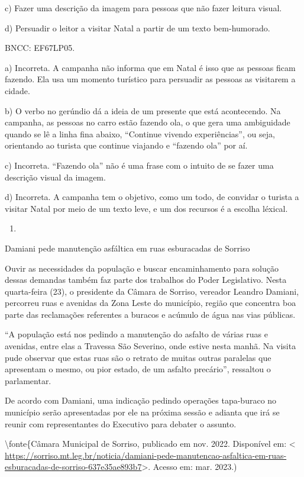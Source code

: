 c) Fazer uma descrição da imagem para pessoas que não fazer leitura
visual.

d) Persuadir o leitor a visitar Natal a partir de um texto bem-humorado.

BNCC: EF67LP05.

a) Incorreta. A campanha não informa que em Natal é isso que as pessoas
ficam fazendo. Ela usa um momento turístico para persuadir as pessoas as
visitarem a cidade.

b) O verbo no gerúndio dá a ideia de um presente que está acontecendo.
Na campanha, as pessoas no carro estão fazendo ola, o que gera uma
ambiguidade quando se lê a linha fina abaixo, ``Continue vivendo
experiências'', ou seja, orientando ao turista que continue viajando e
``fazendo ola'' por aí.

c) Incorreta. ``Fazendo ola'' não é uma frase com o intuito de se fazer
uma descrição visual da imagem.

d) Incorreta. A campanha tem o objetivo, como um todo, de convidar o
turista a visitar Natal por meio de um texto leve, e um dos recursos é a
escolha léxical.

\begin{enumerate}
\def\labelenumi{\arabic{enumi}.}
\setcounter{enumi}{13}
\tightlist
\item
\end{enumerate}

Damiani pede manutenção asfáltica em ruas esburacadas de Sorriso

Ouvir as necessidades da população e buscar encaminhamento para solução
dessas demandas também faz parte dos trabalhos do Poder Legislativo.
Nesta quarta-feira (23), o presidente da Câmara de Sorriso, vereador
Leandro Damiani, percorreu ruas e avenidas da Zona Leste do município,
região que concentra boa parte das reclamações referentes a buracos e
acúmulo de água nas vias públicas.

``A população está nos pedindo a manutenção do asfalto de várias ruas e
avenidas, entre elas a Travessa São Severino, onde estive nesta manhã.
Na visita pude observar que estas ruas são o retrato de muitas outras
paralelas que apresentam o mesmo, ou pior estado, de um asfalto
precário'', ressaltou o parlamentar.

De acordo com Damiani, uma indicação pedindo operações tapa-buraco no
município serão apresentadas por ele na próxima sessão e adianta que irá
se reunir com representantes do Executivo para debater o assunto.

\textbackslash fonte\{Câmara Municipal de Sorriso, publicado em nov.
2022. Disponível em: \textless{}
\url{https://sorriso.mt.leg.br/noticia/damiani-pede-manutencao-asfaltica-em-ruas-esburacadas-de-sorriso-637e35ae893b7}\textgreater.
Acesso em: mar. 2023.)

